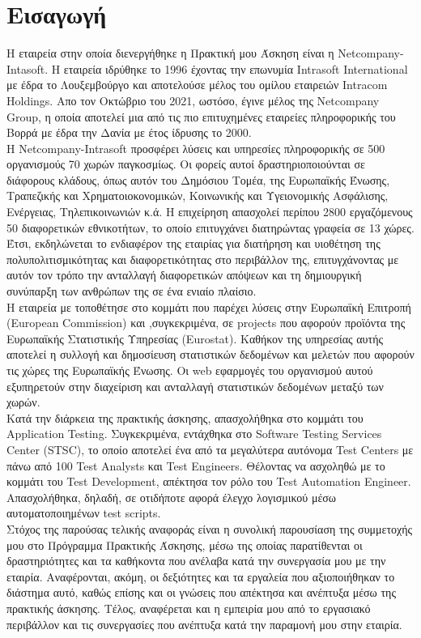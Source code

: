 \setcounter{chapter}{0}
\chapter{Εισαγωγή}

Η εταιρεία στην οποία διενεργήθηκε η Πρακτική μου Άσκηση είναι η Netcompany-Intasoft. Η εταιρεία ιδρύθηκε το 1996 έχοντας την επωνυμία Intrasoft International με έδρα το Λουξεμβούργο και αποτελούσε μέλος του 
ομίλου εταιρειών Intracom Holdings. Απο τον Οκτώβριο του 2021, ωστόσο, έγινε μέλος της Netcompany Group, η οποία αποτελεί μια από τις πιο επιτυχημένες εταιρείες πληροφορικής του Βορρά με έδρα την Δανία με έτος 
ίδρυσης το 2000.\\

Η Netcompany-Intrasoft προσφέρει λύσεις και υπηρεσίες πληροφορικής σε 500 οργανισμούς 70 χωρών παγκοσμίως. Οι φορείς αυτοί δραστηριοποιούνται σε διάφορους κλάδους, όπως αυτόν του Δημόσιου Τομέα, της Ευρωπαϊκής 
Ένωσης, Τραπεζικής και Χρηματοιοκονομικών, Κοινωνικής και Υγειονομικής Ασφάλισης, Ενέργειας, Τηλεπικοινωνιών κ.ά. Η επιχείρηση απασχολεί περίπου 2800 εργαζόμενους 50 διαφορετικών εθνικοτήτων, το οποίο επιτυγχάνει 
διατηρώντας γραφεία σε 13 χώρες. Έτσι, εκδηλώνεται το ενδιαφέρον της εταιρίας για διατήρηση και υιοθέτηση της πολυπολιτισμικότητας και διαφορετικότητας στο περιβάλλον της, επιτυγχάνοντας με αυτόν τον τρόπο την 
ανταλλαγή διαφορετικών απόψεων και τη δημιουργική συνύπαρξη των ανθρώπων της σε ένα ενιαίο πλαίσιο.\\

Η εταιρεία με τοποθέτησε στο κομμάτι που παρέχει λύσεις στην Ευρωπαϊκή Επιτροπή (European Commission) και ,συγκεκριμένα, σε projects που αφορούν προϊόντα της Ευρωπαϊκής Στατιστικής Υπηρεσίας (Eurostat). Καθήκον 
της υπηρεσίας αυτής αποτελεί η συλλογή και δημοσίευση στατιστικών δεδομένων και μελετών που αφορούν τις χώρες της Ευρωπαϊκής Ένωσης. Οι web εφαρμογές του οργανισμού αυτού εξυπηρετούν στην διαχείριση και ανταλλαγή 
στατιστικών δεδομένων μεταξύ των χωρών.\\

Κατά την διάρκεια της πρακτικής άσκησης, απασχολήθηκα στο κομμάτι του Application Testing. Συγκεκριμένα, εντάχθηκα στο Software Testing Services Center (STSC), το οποίο αποτελεί ένα από τα μεγαλύτερα αυτόνομα 
Test Centers με πάνω από 100 Test Analysts και Test Engineers. Θέλοντας να ασχοληθώ με το κομμάτι του Test Development, απέκτησα τον ρόλο του Test Automation Engineer. Απασχολήθηκα, δηλαδή, σε οτιδήποτε αφορά 
έλεγχο λογισμικού μέσω αυτοματοποιημένων test scripts.\\

Στόχος της παρούσας τελικής αναφοράς είναι η συνολική παρουσίαση της συμμετοχής μου στο Πρόγραμμα Πρακτικής Άσκησης, μέσω της οποίας παρατίθενται οι δραστηριότητες και τα καθήκοντα που ανέλαβα κατά την συνεργασία 
μου με την εταιρία. Αναφέρονται, ακόμη, οι δεξιότητες και τα εργαλεία που αξιοποιήθηκαν το διάστημα αυτό, καθώς επίσης και οι γνώσεις που απέκτησα και ανέπτυξα μέσω της πρακτικής άσκησης. Τέλος, αναφέρεται και η 
εμπειρία μου από το εργασιακό περιβάλλον και τις συνεργασίες που ανέπτυξα κατά την παραμονή μου στην εταιρία.
